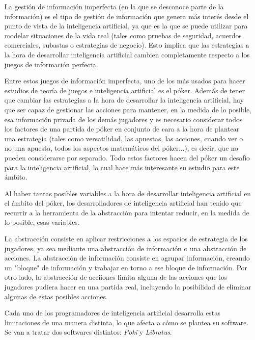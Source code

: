 La gestión de información imperfecta (en la que se desconoce parte de la información) es el tipo de gestión de información que genera más interés desde el punto de vista de la inteligencia artificial, ya que es la que se puede utilizar para modelar situaciones de la vida real (tales como pruebas de seguridad, acuerdos comerciales, subastas o estrategias de negocio). Esto implica que las estrategias a la hora de desarrollar inteligencia artificial cambien completamente respecto a los juegos de información perfecta.\cite{libratusScience2}

Entre estos juegos de información imperfecta, uno de los más usados para hacer estudios de teoría de juegos e inteligencia artificial es el póker. Además de tener que cambiar las estrategias a la hora de desarrollar la inteligencia artificial, hay que ser capaz de gestionar las acciones para mantener, en la medida de lo posible, esa información privada de los demás jugadores y es necesario considerar todos los factores de una partida de póker en conjunto de cara a la hora de plantear una estrategia (tales como versatilidad, las apuestas, las acciones, cuando ver o no una apuesta, todos los aspectos matemáticos del póker...), es decir, que no pueden considerarse por separado. Todo estos factores hacen del póker un desafío para la inteligencia artificial, lo cual hace más interesante su estudio para este ámbito.\cite{libratusScience2}

Al haber tantas posibles variables a la hora de desarrollar inteligencia artificial en el ámbito del póker, los desarrolladores de inteligencia artificial han tenido que recurrir a la herramienta de la abstracción para intentar reducir, en la medida de lo posible, esas variables. 

La abstracción consiste en aplicar restricciones a los espacios de estrategia de los jugadores, ya sea mediante una abstracción de información o una abstracción de acciones.
La abstracción de información consiste en agrupar información, creando un "bloque" de información y trabajar en torno a ese bloque de información. Por otro lado, la abstracción de acciiones limita alguna de las acciones que los jugadores pudiera hacer en una partida real, incluyendo la posibilidad de eliminar algunas de estas posibles acciones. \cite{abstraction}

Cada uno de los programadores de inteligencia artificial desarrolla estas limitaciones de una manera distinta, lo que afecta a cómo se plantea su software. Se van a tratar dos softwares distintos: \textit{Poki} y \textit{Libratus}.

